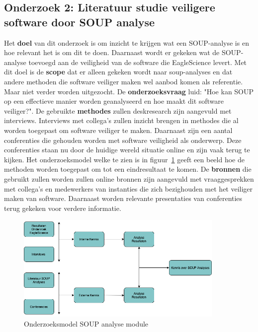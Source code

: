 

\subsection{Onderzoek 2: Literatuur studie veiligere software door SOUP analyse}\label{subsec:onderzoek-literatuur-studie-soup}
Het \textbf{doel} van dit onderzoek is om inzicht te krijgen wat een SOUP-analyse is en hoe relevant het is om dit te doen. Daarnaast wordt er gekeken wat de SOUP-analyse toevoegd aan de veiligheid van de software die EagleScience levert. Met dit doel is de \textbf{scope} dat er alleen gekeken wordt naar soup-analyses en dat andere methoden die software veiliger maken wel aanbod komen als referentie. Maar niet verder worden uitgezocht.  De \textbf{onderzoeksvraag} luid: "Hoe kan SOUP op een effectieve manier worden geanalyseerd en hoe maakt dit software veiliger?". De gebruikte \textbf{methodes} zullen deskresearch zijn aangevuld met interviews. Interviews met collega's zullen inzicht brengen in methodes die al worden toegepast om software veiliger te maken. Daarnaast zijn een aantal conferenties die gehouden worden met software veiligheid als onderwerp. Deze conferenties staan nu door de huidige wereld situatie online en zijn vaak terug te kijken. Het onderzoeksmodel welke te zien is in figuur~\ref{fig:OnderzoeksModelNoodZaakSOUP} geeft een beeld hoe de methoden worden toegepast om tot een eindresultaat te komen. De \textbf{bronnen} die gebruikt zullen worden zullen online bronnen zijn aangevuld met vraaggesprekken met collega's en medewerkers van instanties die zich bezighouden met het veiliger maken van software. Daarnaast worden relevante presentaties van conferenties terug gekeken voor verdere informatie.
\begin{figure}[htbp]
    \myfloatalign
    \includegraphics[width=10cm]{gfx/OnderzoeksmodelSOUP}
    \caption{Onderzoeksmodel SOUP analyse module}
    \label{fig:OnderzoeksModelNoodZaakSOUP}
\end{figure}

